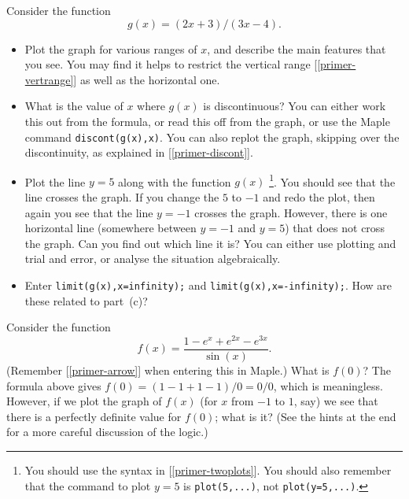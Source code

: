 \documentclass[a4paper,10pt]{amsbook}
\begin{document}
\begin{exercise}\label{ex-mobius}
 Consider the function
 \[ g(x) = (2x+3)/(3x-4). \]
 \begin{itemize}
  \item[(a)]
   Plot the graph for various ranges of $x$, and describe the main
   features that you see.  You may find it helps to restrict the
   vertical range [\ref{primer-vertrange}] as well as the horizontal one.
  \item[(b)] What is the value of $x$ where $g(x)$ is discontinuous? 
   You can either work this out from the formula, or read this off
   from the graph, or use the Maple command \verb~discont(g(x),x)~. 
   You can also replot the graph, skipping over the
   discontinuity, as explained in [\ref{primer-discont}].
  \item[(c)] 
   Plot the line $y=5$ along with the function $g(x)$  
   \footnote{You should use the syntax in [\ref{primer-twoplots}].  You
   should also remember that the command to plot $y=5$ is
   \verb~plot(5,...)~, not \verb~plot(y=5,...)~.}. 
   You should see that the line crosses the graph.  If you change the
   $5$ to $-1$ and redo the plot, then again you see that the line
   $y=-1$ crosses the graph.  However, there is one horizontal line
   (somewhere between $y=-1$ and $y=5$) that does not cross the
   graph.  Can you find out which line it is?  You can either use
   plotting and trial and error, or analyse the situation
   algebraically. 
  \item[(d)] Enter \verb~limit(g(x),x=infinity);~ and
   \verb~limit(g(x),x=-infinity);~.  How are these related to
   part~(c)? 
 \end{itemize}
\end{exercise}
        
\begin{exercise}\label{ex-lhopital}
 Consider the function
 \[ f(x) = \frac{1 - e^x + e^{2x} - e^{3x}}{\sin(x)}. \]
 (Remember [\ref{primer-arrow}] when entering this in Maple.)
 What is $f(0)$?  The formula above gives $f(0)=(1-1+1-1)/0=0/0$,
 which is meaningless.  However, if we plot the graph of $f(x)$ (for
 $x$ from $-1$ to $1$, say) we see that there is a perfectly definite
 value for $f(0)$; what is it?  
(See the hints at the end for a more careful discussion of the logic.) 
\end{exercise}
\end{document}
